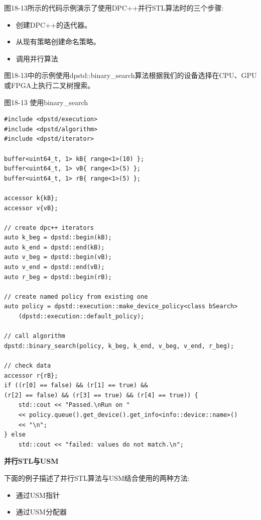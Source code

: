 图18-13所示的代码示例演示了使用DPC++并行STL算法时的三个步骤:\par

\begin{itemize}
	\item 创建DPC++的迭代器。
	\item 从现有策略创建命名策略。
	\item 调用并行算法
\end{itemize}

图18-13中的示例使用dpstd::binary\_search算法根据我们的设备选择在CPU、GPU或FPGA上执行二叉树搜索。\par

\hspace*{\fill} \par %
图18-13 使用binary\_search
\begin{lstlisting}[caption={}]
#include <dpstd/execution>
#include <dpstd/algorithm>
#include <dpstd/iterator>

buffer<uint64_t, 1> kB{ range<1>(10) };
buffer<uint64_t, 1> vB{ range<1>(5) };
buffer<uint64_t, 1> rB{ range<1>(5) };

accessor k{kB};
accessor v{vB};

// create dpc++ iterators
auto k_beg = dpstd::begin(kB);
auto k_end = dpstd::end(kB);
auto v_beg = dpstd::begin(vB);
auto v_end = dpstd::end(vB);
auto r_beg = dpstd::begin(rB);

// create named policy from existing one
auto policy = dpstd::execution::make_device_policy<class bSearch>
	(dpstd::execution::default_policy);

// call algorithm
dpstd::binary_search(policy, k_beg, k_end, v_beg, v_end, r_beg);

// check data
accessor r{rB};
if ((r[0] == false) && (r[1] == true) && 
(r[2] == false) && (r[3] == true) && (r[4] == true)) {
	std::cout << "Passed.\nRun on "
	<< policy.queue().get_device().get_info<info::device::name>()
	<< "\n";
} else
	std::cout << "failed: values do not match.\n";
\end{lstlisting}

\hspace*{\fill} \par %
\textbf{并行STL与USM}

下面的例子描述了并行STL算法与USM结合使用的两种方法:\par

\begin{itemize}
	\item 通过USM指针
	\item 通过USM分配器
\end{itemize}

